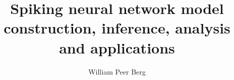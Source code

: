 \documentclass[mphil,deptreport,ai]{infthesis} %
\begin{document}
\begin{preliminary}

\title{Spiking neural network model construction, inference, analysis and applications}

\author{William Peer Berg}




\end{preliminary}
\end{document}
